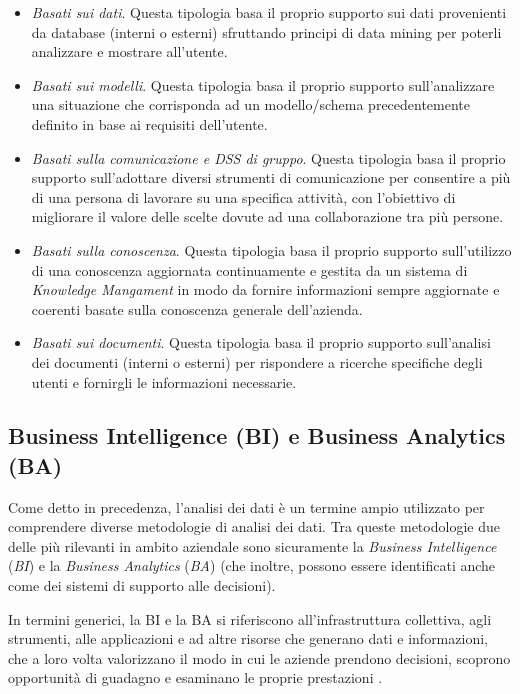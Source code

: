 \begin{itemize}
    \item \textit{Basati sui dati}. Questa tipologia basa il proprio supporto sui dati provenienti da database (interni o esterni) sfruttando principi di data mining per poterli analizzare e mostrare all'utente.
    \item \textit{Basati sui modelli}. Questa tipologia basa il proprio supporto sull'analizzare una situazione che corrisponda ad un modello/schema precedentemente definito in base ai requisiti dell'utente.
    \item \textit{Basati sulla comunicazione e DSS di gruppo}. Questa tipologia basa il proprio supporto sull'adottare diversi strumenti di comunicazione per consentire a più di una persona di lavorare su una specifica attività, con l'obiettivo di migliorare il valore delle scelte dovute ad una collaborazione tra più persone.
    \item \textit{Basati sulla conoscenza}. Questa tipologia basa il proprio supporto sull'utilizzo di una conoscenza aggiornata continuamente e gestita da un sistema di \textit{Knowledge Mangament} in modo da fornire informazioni sempre aggiornate e coerenti basate sulla conoscenza generale dell'azienda.
    \item \textit{Basati sui documenti}. Questa tipologia basa il proprio supporto sull'analisi dei documenti (interni o esterni) per rispondere a ricerche specifiche degli utenti e fornirgli le informazioni necessarie. 
\end{itemize}


\subsection{Business Intelligence (BI) e Business Analytics (BA)}
Come detto in precedenza, l'analisi dei dati è un termine ampio utilizzato per comprendere diverse metodologie di analisi dei dati. Tra queste metodologie due delle più rilevanti in ambito aziendale sono sicuramente la \textit{Business Intelligence} (\textit{BI}) e la \textit{Business Analytics} (\textit{BA}) (che inoltre, possono essere identificati anche come dei sistemi di supporto alle decisioni).

In termini generici, la BI e la BA si riferiscono all'infrastruttura collettiva, agli strumenti, alle applicazioni e ad altre risorse che generano dati e informazioni, che a loro volta valorizzano il modo in cui le aziende prendono decisioni, scoprono opportunità di guadagno e esaminano le proprie prestazioni \cite{hpe_bi_and_a}.

